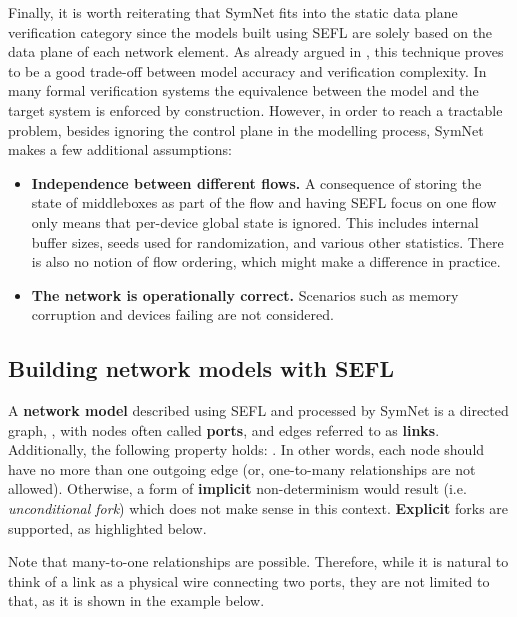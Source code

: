 \bigskip

Finally, it is worth reiterating that SymNet fits into the static data plane
verification category since the models built using SEFL are solely based on the
data plane of each network element.  As already argued in
, this technique proves to be a
good trade-off between model accuracy and verification complexity.  In many
formal verification systems the equivalence between the model and the target
system is enforced by construction.  However, in order to reach a tractable
problem, besides ignoring the control plane in the modelling process, SymNet
makes a few additional assumptions:
\begin{itemize}
  \item \textbf{Independence between different flows.} A consequence of
    storing the state of middleboxes as part of the flow and having SEFL focus
    on one flow only means that per-device global state is ignored.  This
    includes internal buffer sizes, seeds used for randomization, and various
    other statistics. There is also no notion of flow ordering, which might
    make a difference in practice.
  \item \textbf{The network is operationally correct.} Scenarios such as memory
    corruption and devices failing are not considered.
\end{itemize}


\subsection{Building network models with SEFL}

A \textbf{network model} described using SEFL and processed by SymNet is a
directed graph, , with nodes  often
called \textbf{ports}, and edges  referred to as
\textbf{links}.  Additionally, the following property holds: . In other words, each node should have no more than
one outgoing edge (or, one-to-many relationships are not allowed). Otherwise, a
form of \textbf{implicit} non-determinism would result (i.e.
\emph{unconditional fork}) which does not make sense in this context.
\textbf{Explicit} forks are supported, as highlighted below.

Note that many-to-one relationships are possible. Therefore, while it is
natural to think of a link as a physical wire connecting two ports, they are
not limited to that, as it is shown in the example below.

